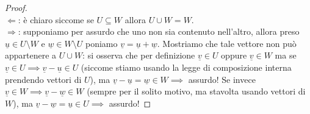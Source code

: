 \begin{proof} \hspace{1cm} \\
    $\boxed{\Leftarrow}$: è chiaro siccome se $U \subseteq W$ allora $U \cup W = W$. \\
    $\boxed{\Rightarrow}$: supponiamo per assurdo che uno non sia contenuto nell'altro, allora preso $\underline{u} \in U \setminus W$ e $\underline{w} \in W \setminus U$ poniamo $\underline{v} = \underline{u} + \underline{w}$. Mostriamo che tale vettore non può appartenere a $U \cup W$: si osserva che per definizione $\underline{v} \in U$ oppure $\underline{v} \in W$ ma se $\underline{v} \in U \implies \underline{v} - \underline{u} \in U$ (siccome stiamo usando la legge di composizione interna prendendo vettori di $U$), ma $\underline{v} - \underline{u} = \underline{w} \in W \implies$ assurdo! Se invece $\underline{v} \in W \implies \underline{v} - \underline{w} \in W$ (sempre per il solito motivo, ma stavolta usando
    vettori di $W$), ma $\underline{v} - \underline{w} = \underline{u} \in U \implies$ assurdo!
\end{proof}

